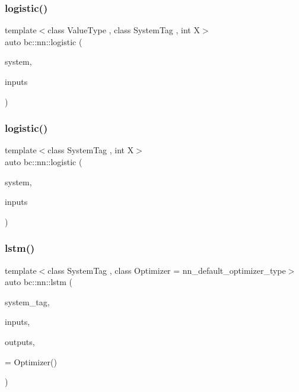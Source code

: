\mbox{\label{namespacebc_1_1nn_a2f995cbb0542f096ceac9e6d5df6408f}} 
\subsubsection{\texorpdfstring{logistic()}{logistic()}\hspace{0.1cm}{\footnotesize\ttfamily [4/5]}}
{\footnotesize\ttfamily template$<$class Value\+Type , class System\+Tag , int X$>$ \\
auto bc\+::nn\+::logistic (\begin{DoxyParamCaption}\item[{System\+Tag}]{system,  }\item[{\hyperlink{structbc_1_1Dim}{bc\+::\+Dim}$<$ X $>$}]{inputs }\end{DoxyParamCaption})}

\mbox{\label{namespacebc_1_1nn_a6ae0cff41285566585676c1ea3c392ec}} 
\subsubsection{\texorpdfstring{logistic()}{logistic()}\hspace{0.1cm}{\footnotesize\ttfamily [5/5]}}
{\footnotesize\ttfamily template$<$class System\+Tag , int X$>$ \\
auto bc\+::nn\+::logistic (\begin{DoxyParamCaption}\item[{System\+Tag}]{system,  }\item[{\hyperlink{structbc_1_1Dim}{bc\+::\+Dim}$<$ X $>$}]{inputs }\end{DoxyParamCaption})}

\mbox{\label{namespacebc_1_1nn_a0a16bba0c1484ef3e4c1785b18a08333}} 
\subsubsection{\texorpdfstring{lstm()}{lstm()}\hspace{0.1cm}{\footnotesize\ttfamily [1/2]}}
{\footnotesize\ttfamily template$<$class System\+Tag , class Optimizer  = nn\+\_\+default\+\_\+optimizer\+\_\+type$>$ \\
auto bc\+::nn\+::lstm (\begin{DoxyParamCaption}\item[{System\+Tag}]{system\+\_\+tag,  }\item[{int}]{inputs,  }\item[{int}]{outputs,  }\item[{Optimizer}]{ = {\ttfamily Optimizer()} }\end{DoxyParamCaption})}

